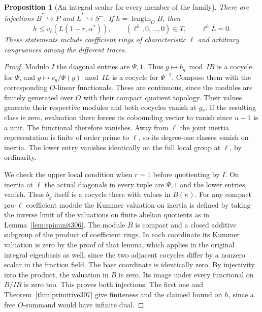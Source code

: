 \documentclass[a4paper,11pt]{article}
\newtheorem{proposition}{Proposition}[section]
\theoremstyle{definition}
\theoremstyle{remark}
\numberwithin{equation}{section}
\begin{document}
\begin{proposition}[An integral scalar for every member of the family]\leavevmode
\label{prop:spinclasses307}
There are injections \(\overline B^*\hookrightarrow P\) and
\(\overline L^*\hookrightarrow S^-\). If
\(h=\operatorname{length}_O\overline B\), then
\[
    h\le v_\ell(L(1-r,\alpha^*)),\qquad
    (\ell^h,0,\ldots,0)\in T,\qquad
    \ell^h\overline L=0 .
\]
These statements include coefficient rings of characteristic
\(\ell\) and arbitrary congruences among the different traces.
\end{proposition}
\begin{proof}
Modulo \(I\) the diagonal entries are \(\Psi,1\).
Thus \(g\mapsto b_g\bmod IB\) is a cocycle for \(\Psi\), and
\(g\mapsto c_g/\Psi(g)\bmod IL\) is a cocycle for
\(\Psi^{-1}\). Compose them with the corresponding
\(O\)-linear functionals. These are continuous, since
the modules are finitely generated over \(O\) with their
compact quotient topology. Their values generate their
respective modules and both cocycles vanish at \(g_*\).
If the resulting class is zero, evaluation there forces
its cobounding vector to vanish since \(u-1\) is a unit.
The functional therefore vanishes. Away from \(\ell\) the
joint inertia representation is finite of order prime to
\(\ell\), so its degree-one classes vanish on inertia. The
lower entry vanishes identically on the full local group at
\(\ell\), by ordinarity.

We check the upper local condition when \(r=1\) before
quotienting by \(I\). On inertia at \(\ell\) the actual
diagonals in every tuple are \(\Psi,1\) and the lower entries
vanish. Thus \(b_g\) itself is a cocycle there with values
in \(B(\kappa)\). For any compact pro-\(\ell\) coefficient
module the Kummer valuation on inertia is defined by taking
the inverse limit of the valuations on finite abelian
quotients as in Lemma~\ref{lem:spinunit306}. The module \(B\)
is compact and a closed additive subgroup of the product of
coefficient rings. In each coordinate its Kummer valuation
is zero by the proof of that lemma, which applies in the original
integral eigenbasis as well, since the two adjacent cocycles
differ by a nonzero scalar in the fraction field. The base
coordinate is identically zero. By injectivity into the
product, the valuation in \(B\) is zero. Its image under every
functional on \(B/IB\) is zero too. This proves both injections.
The first one and Theorem~\ref{thm:primitive307} give finiteness
and the claimed bound on \(h\), since a free \(O\)-summand
would have infinite dual.


\end{proof}
\end{document}
